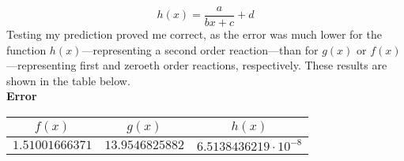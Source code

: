 \documentclass[a4paper]{article}
\begin{document}
\begin{center}
\begin{equation}
                    h(x)=\frac{a}{bx+c}+d
                \end{equation}
                Testing my prediction proved me correct, as the error was much lower
                for the function $h(x)$---representing a second order reaction---than
                for $g(x)$ or $f(x)$---representing first and zeroeth order reactions,
                respectively. These results are shown in the table below.
                \\
                \bf{Error}
                \\
                \begin{tabular}{|c|c|c|}
                    \hline
                    $f(x)$ & $g(x)$ & $h(x)$
                    \\\hline
                    $\num[round-precision=5]{1.51001666371}$ & $\num[round-precision=5]{13.9546825882}$ & $\num[round-precision=5]{6.5138436219}\cdot10^{-8}$
                    \\\hline
                \end{tabular}
            \end{center}
\end{document}

